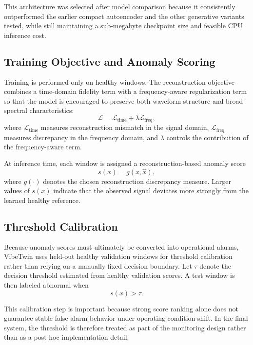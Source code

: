 This architecture was selected after model comparison because it consistently outperformed the earlier compact autoencoder and the other generative variants tested, while still maintaining a sub-megabyte checkpoint size and feasible CPU inference cost.

\subsection{Training Objective and Anomaly Scoring}

Training is performed only on healthy windows. The reconstruction objective combines a time-domain fidelity term with a frequency-aware regularization term so that the model is encouraged to preserve both waveform structure and broad spectral characteristics:
\begin{equation}
\mathcal{L} = \mathcal{L}_{\text{time}} + \lambda \mathcal{L}_{\text{freq}},
\end{equation}
where $\mathcal{L}_{\text{time}}$ measures reconstruction mismatch in the signal domain, $\mathcal{L}_{\text{freq}}$ measures discrepancy in the frequency domain, and $\lambda$ controls the contribution of the frequency-aware term.

At inference time, each window is assigned a reconstruction-based anomaly score
\begin{equation}
s(x) = g(x,\hat{x}),
\end{equation}
where $g(\cdot)$ denotes the chosen reconstruction discrepancy measure. Larger values of $s(x)$ indicate that the observed signal deviates more strongly from the learned healthy reference.

\subsection{Threshold Calibration}

Because anomaly scores must ultimately be converted into operational alarms, VibeTwin uses held-out healthy validation windows for threshold calibration rather than relying on a manually fixed decision boundary. Let $\tau$ denote the decision threshold estimated from healthy validation scores. A test window is then labeled abnormal when
\begin{equation}
s(x) > \tau.
\end{equation}

This calibration step is important because strong score ranking alone does not guarantee stable false-alarm behavior under operating-condition shift. In the final system, the threshold is therefore treated as part of the monitoring design rather than as a post hoc implementation detail.

